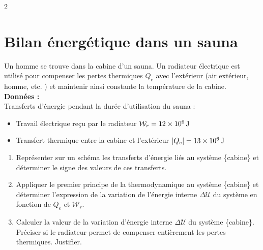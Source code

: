 \documentclass[a4paper,11pt,fleqn]{article}%
\begin{document}
\begin{multicols}{2}
\section{Bilan énergétique dans un sauna}
Un homme se trouve dans la cabine d'un sauna. Un radiateur électrique est utilisé pour compenser les pertes thermiques $Q_e$ avec l'extérieur (air extérieur, homme, etc. ) et maintenir ainsi constante la température de la cabine.\\
\textbf{Données :}\\
Transferts d'énergie pendant la durée d'utilisation du sauna :
\begin{itemize}
	\item Travail électrique reçu par le radiateur $\mathcal{W}_r = \SI{12E6}{J}$
	\item Transfert thermique entre la cabine et l'extérieur $|Q_e| = \SI{13E6}{J}$
\end{itemize}
\begin{enumerate}
	\item Représenter sur un schéma les transferts d'énergie liés au système \{cabine\} et déterminer le signe des valeurs de ces transferts.
	\item Appliquer le premier principe de la thermodynamique au système \{cabine\} et déterminer l'expression de la variation de l'énergie interne $\Delta \mathcal{U}$ du système en fonction de $Q_e$ et $\mathcal{W}_r$.
	\item Calculer la valeur de la variation d'énergie interne $\Delta \mathcal{U}$ du système \{cabine\}. Préciser si le radiateur permet de compenser entièrement les pertes thermiques. Justifier.
\end{enumerate}


\end{multicols}
\end{document}
